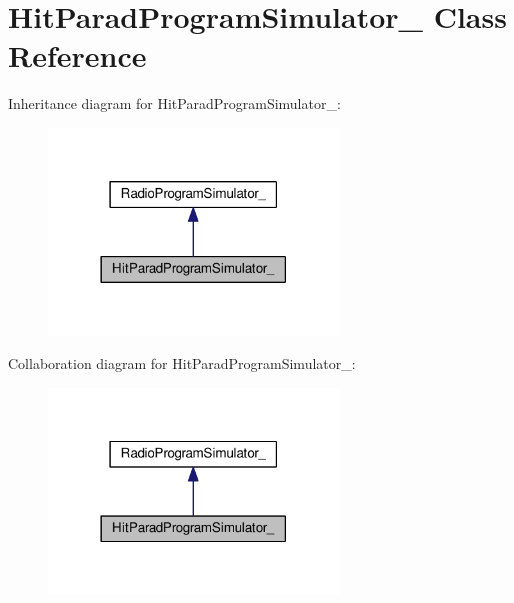 \hypertarget{class_hit_parad_program_simulator__}{}\section{Hit\+Parad\+Program\+Simulator\+\_\+ Class Reference}
\label{class_hit_parad_program_simulator__}


Inheritance diagram for Hit\+Parad\+Program\+Simulator\+\_\+\+:
\nopagebreak
\begin{figure}[H]
\begin{center}
\leavevmode
\includegraphics[width=218pt]{class_hit_parad_program_simulator____inherit__graph}
\end{center}
\end{figure}


Collaboration diagram for Hit\+Parad\+Program\+Simulator\+\_\+\+:
\nopagebreak
\begin{figure}[H]
\begin{center}
\leavevmode
\includegraphics[width=218pt]{class_hit_parad_program_simulator____coll__graph}
\end{center}
\end{figure}
